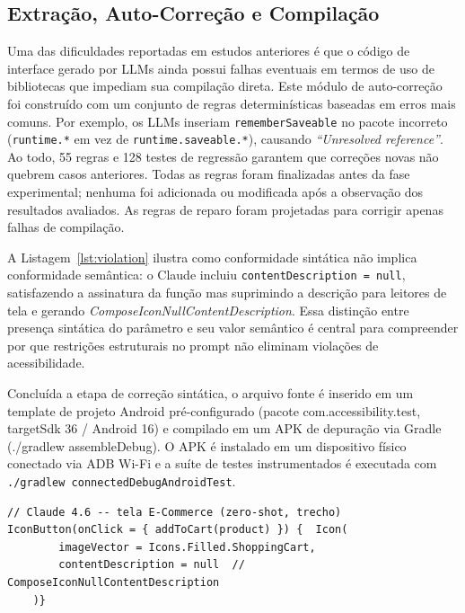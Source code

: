 \documentclass[sigconf,anonymous,review]{webmedia}
\begin{document}
\subsection{Extração, Auto-Correção e Compilação}
Uma das dificuldades reportadas em estudos anteriores \cite{anonref1,anonref3} é que o código de interface gerado por LLMs ainda possui falhas eventuais em termos de uso de bibliotecas que impediam sua compilação direta. Este módulo de auto-correção foi construído com um conjunto de regras determinísticas baseadas em erros mais comuns. Por exemplo, os LLMs inseriam \texttt{rememberSaveable} no pacote incorreto (\texttt{runtime.*} em vez de \texttt{runtime.saveable.*}), causando \textit{``Unresolved reference''}. Ao todo, 55 regras e 128 testes de regressão garantem que correções novas não quebrem casos anteriores. Todas as regras foram finalizadas antes da fase experimental; nenhuma foi adicionada ou modificada após a observação dos resultados avaliados. As regras de reparo foram projetadas para corrigir apenas falhas de compilação. %

A Listagem~\ref{lst:violation} ilustra como conformidade sintática não implica conformidade semântica: o Claude incluiu \texttt{contentDescription\,=\,null}, satisfazendo a assinatura da função mas suprimindo a descrição para leitores de tela e gerando \textit{ComposeIconNullContentDescription}. Essa distinção entre presença sintática do parâmetro e seu valor semântico é central para compreender por que restrições estruturais no prompt não eliminam violações de acessibilidade.

Concluída a etapa de correção sintática, o arquivo fonte é inserido em um template de projeto Android pré-configurado (pacote com.accessibility.test, targetSdk 36 / Android 16) e compilado em um APK de depuração via Gradle (./gradlew assembleDebug). O APK é instalado em um dispositivo físico conectado via ADB
Wi-Fi e a suíte de testes instrumentados é executada com
\texttt{./gradlew connectedDebugAndroidTest}.

\begin{lstlisting}[caption={Violação detectada pelo pipeline na tela E-Commerce (Claude~4.6, trecho).},
                   label=lst:violation,
                   basicstyle=\ttfamily\tiny]
// Claude 4.6 -- tela E-Commerce (zero-shot, trecho)
IconButton(onClick = { addToCart(product) }) {  Icon(
        imageVector = Icons.Filled.ShoppingCart,
        contentDescription = null  // ComposeIconNullContentDescription
    )}
\end{lstlisting}
\end{document}
